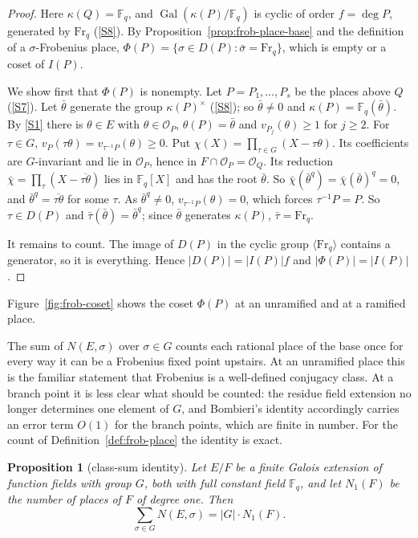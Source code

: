 \documentclass[11pt]{amsbook}
\theoremstyle{plain}
\newtheorem{proposition}[theorem]{Proposition}
\theoremstyle{definition}
\theoremstyle{remark}
\numberwithin{equation}{section}
\numberwithin{figure}{chapter}
\numberwithin{table}{chapter}
\newcommand{\F}{\mathbb{F}}
\newcommand{\Gal}{\operatorname{Gal}}
\newcommand{\Fr}{\mathrm{Fr}}
\newcommand{\calO}{\mathcal{O}}
\begin{document}
\begin{proof}
Here $\kappa(Q)=\F_q$, and $\Gal(\kappa(P)/\F_q)$ is cyclic of
order $f=\deg P$, generated by $\Fr_q$ (\ref{S8}). By
Proposition~\ref{prop:frob-place-base} and the definition of a
$\sigma$-Frobenius place,
$\Phi(P)=\{\sigma\in D(P):\bar\sigma=\Fr_q\}$, which is empty or a
coset of $I(P)$.

We show first that $\Phi(P)$ is nonempty. Let $P=P_1,\dots,P_s$ be the places
above $Q$
(\ref{S7}). Let $\bar\theta$ generate the group $\kappa(P)^\times$
(\ref{S8}); so $\bar\theta\ne0$ and
$\kappa(P)=\F_q(\bar\theta)$. By \ref{S1} there is $\theta\in E$
with $\theta\in\calO_P$, $\theta(P)=\bar\theta$ and
$v_{P_j}(\theta)\ge1$ for $j\ge2$. For $\tau\in G$,
$v_P(\tau\theta)=v_{\tau^{-1}P}(\theta)\ge0$. Put
$\chi(X)=\prod_{\tau\in G}(X-\tau\theta)$. Its coefficients are
$G$-invariant and lie in $\calO_P$, hence in
$F\cap\calO_P=\calO_Q$. Its reduction
$\bar\chi=\prod_\tau(X-\overline{\tau\theta})$ lies in $\F_q[X]$
and has the root $\bar\theta$. So
$\bar\chi(\bar\theta^q)=\bar\chi(\bar\theta)^q=0$, and
$\bar\theta^q=\overline{\tau\theta}$ for some $\tau$. As
$\bar\theta^q\ne0$, $v_{\tau^{-1}P}(\theta)=0$, which forces
$\tau^{-1}P=P$. So $\tau\in D(P)$ and
$\bar\tau(\bar\theta)=\bar\theta^q$; since $\bar\theta$ generates
$\kappa(P)$, $\bar\tau=\Fr_q$.

It remains to count. The image of $D(P)$ in the cyclic group
$\langle\Fr_q\rangle$ contains a generator, so it is everything.
Hence $\lvert D(P)\rvert=\lvert I(P)\rvert f$ and
$\lvert\Phi(P)\rvert=\lvert I(P)\rvert$.
\end{proof}

Figure~\ref{fig:frob-coset} shows the coset $\Phi(P)$ at an
unramified and at a ramified place.

The sum of $N(E,\sigma)$ over $\sigma\in G$ counts each rational
place of the base once for every way it can be a Frobenius fixed
point upstairs. At an unramified place this is the familiar
statement that Frobenius is a well-defined conjugacy class. At a
branch point it is less clear what should be counted: the residue
field extension no longer determines one element of $G$, and
Bombieri's identity \cite[p.~240, eq.~(9)]{Bombieri1974}
accordingly carries an error term $O(1)$ for the branch points,
which are finite in number. For the count of
Definition~\ref{def:frob-place} the identity is exact.

\begin{proposition}[class-sum identity]\label{prop:class-sum}
Let $E/F$ be a finite Galois extension of function fields with
group $G$, both with full constant field $\F_q$, and let $N_1(F)$
be the number of places of $F$ of degree one. Then
\begin{equation}\label{eq:class-sum}
\sum_{\sigma\in G}N(E,\sigma)=\lvert G\rvert\cdot N_1(F).
\end{equation}
\end{proposition}
\end{document}
